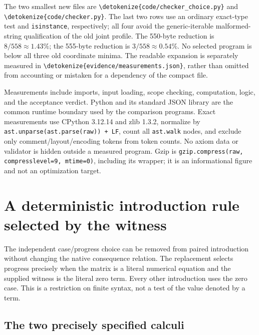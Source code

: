 \documentclass[11pt,letterpaper]{article}
\theoremstyle{definition}\newtheorem{definition}[theorem]{Definition}
\theoremstyle{remark}\newtheorem{remark}[theorem]{Remark}
\newcommand{\file}[1]{\expandafter\nolinkurl\expandafter{\detokenize{#1}}}
\begin{document}
The two smallest new files are \file{code/checker_choice.py} and
\file{code/checker.py}. The last two rows use an ordinary exact-type test
and \texttt{isinstance}, respectively; all four avoid the generic-iterable
malformed-string qualification of the old joint profile. The 550-byte
reduction is $8/558\approx1.43\%$; the 555-byte reduction is
$3/558\approx0.54\%$. No selected program is below all three old
coordinate minima. The readable expansion is separately measured in
\file{evidence/measurements.json}, rather than omitted from accounting or
mistaken for a dependency of the compact file.

Measurements include imports, input loading, scope checking, computation,
logic, and the acceptance verdict. Python and its standard JSON library
are the common runtime boundary used by the comparison programs. Exact
measurements use CPython 3.12.14 and zlib 1.3.2, normalize by
\texttt{ast.unparse(ast.parse(raw)) + LF}, count all \texttt{ast.walk}
nodes, and exclude only comment/layout/encoding tokens from token counts.
No axiom data or validator is hidden outside a measured program.
Gzip is \texttt{gzip.compress(raw, compresslevel=9, mtime=0)}, including
its wrapper; it is an informational figure and not an optimization target.

\section{A deterministic introduction rule selected by the witness}
\label{sec:deterministic-witness}

The independent case/progress choice can be removed from paired
introduction without changing the native consequence relation.  The
replacement selects progress precisely when the matrix is a literal
numerical equation and the supplied witness is the literal zero term.
Every other introduction uses the zero case.  This is a restriction on
finite syntax, not a test of the value denoted by a term.

\subsection{The two precisely specified calculi}
\end{document}
